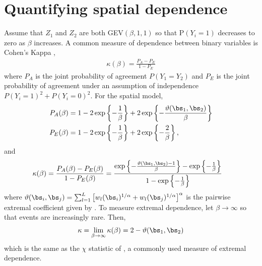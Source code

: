 
\section{Quantifying spatial dependence} \label{rbs:spatdep}
Assume that $Z_1$ and $Z_2$ are both GEV$(\beta, 1, 1)$ so that P$(Y_i = 1)$ decreases to zero as $\beta$ increases.
A common measure of dependence between binary variables is Cohen's Kappa \citep{Cohen1960},
\begin{align}
  \kappa(\beta) = \frac{P_A - P_E}{1 - P_E}
\end{align}
where $P_A$ is the joint probability of agreement $P(Y_1 = Y_2)$ and $P_E$ is the joint probability of agreement under an assumption of independence $P(Y_i = 1)^2 + P(Y_i = 0)^2$.
For the spatial model,
\begin{align*}
  P_A(\beta) &= 1 - 2 \exp\left\{ -\frac{1}{\beta} \right\} + 2 \exp\left\{-\frac{\vartheta(\bs_1, \bs_2)}{\beta}  \right\} \nonumber \\
  P_E(\beta) &= 1 - 2 \exp \left\{ -\frac{1}{\beta} \right\} + 2 \exp \left\{ -\frac{2}{\beta} \right\}, \nonumber
\end{align*}
and
\begin{align} \label{rbeq:kappa}
  \kappa(\beta) &= \frac{P_A(\beta) - P_E(\beta)}{1 - P_E(\beta)} = \frac{\exp\left\{-\frac{\vartheta(\bs_1, \bs_2) - 1}{\beta}  \right\} - \exp \left\{ -\frac{1}{\beta} \right\}}{1 - \exp \left\{ -\frac{1}{\beta} \right\}}
\end{align}
where $\vartheta (\bs_i, \bs_j) = \sum_{ l = 1 }^{ L } \left[ w_{l}(\bs_i)^{ 1/\alpha } +  w_{ l}(\bs_j)^{ 1/\alpha } \right]^\alpha$ is the pairwise extremal coefficient given by \citet{Reich2012}.
To measure extremal dependence, let $\beta \rightarrow \infty$ so that events are increasingly rare.
Then,
\begin{align}
  \kappa = \lim_{\beta \rightarrow \infty} \kappa(\beta) = 2 - \vartheta(\bs_1, \bs_2)
\end{align}
which is the same as the $\chi$ statistic of \citet{Coles2001}, a commonly used measure of extremal dependence.

